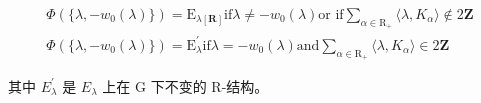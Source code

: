 \[
\begin{array}{c} \Phi (\{\lambda , - w _ {0} (\lambda) \}) = \mathrm{E} _ {\lambda [ \mathbf {R} ]} \text {if} \lambda \neq - w _ {0} (\lambda) \text {or if} \sum_ {\alpha \in \mathrm{R} _ {+}} \langle \lambda , K _ {\alpha} \rangle \notin 2 \mathbf {Z} \\ \Phi (\{\lambda , - w _ {0} (\lambda) \}) = \mathrm{E} _ {\lambda} ^ {\prime} \text {if} \lambda = - w _ {0} (\lambda) \text {and} \sum_ {\alpha \in \mathrm{R} _ {+}} \langle \lambda , K _ {\alpha} \rangle \in 2 \mathbf {Z} \end{array}
\]

其中 \(E_{\lambda}^{\prime}\) 是 \(E_{\lambda}\) 上在 G 下不变的 R-结构。

